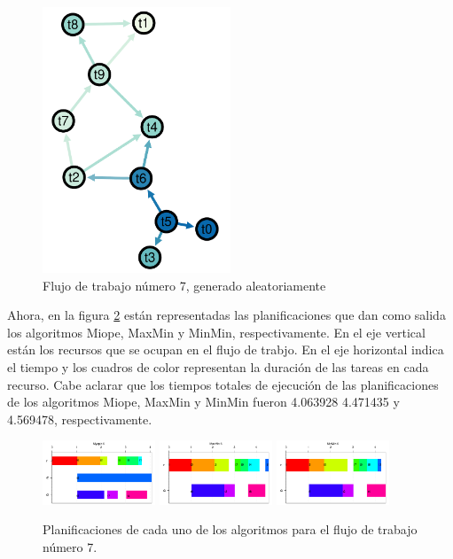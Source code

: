 \begin{figure}
\begin{center}
  \includegraphics[width=0.5\textwidth]{imagenes/workflow6.pdf}
\end{center}
\label{fig:workflow6}
\caption{Flujo de trabajo número 7, generado aleatoriamente}
\end{figure}

Ahora, en la figura \ref{fig:schedules6} están representadas las planificaciones que dan como salida los algoritmos Miope, MaxMin y MinMin, respectivamente. En el eje vertical están los recursos que se ocupan en el flujo de trabjo. En el eje horizontal indica el tiempo y los cuadros de color representan la duración de las tareas en cada recurso. Cabe aclarar que los tiempos totales de ejecución de las planificaciones de los algoritmos Miope, MaxMin y MinMin fueron 4.063928  4.471435 y 4.569478, respectivamente.

\begin{figure}
\begin{center}
  \includegraphics[width=0.3\textwidth]{imagenes/Myopic6.pdf}
  \includegraphics[width=0.3\textwidth]{imagenes/MaxMin6.pdf}
  \includegraphics[width=0.3\textwidth]{imagenes/MinMin6.pdf}
\end{center}
\label{fig:schedules6}
\caption{Planificaciones de cada uno de los algoritmos para el flujo de trabajo número 7.}
\end{figure}

